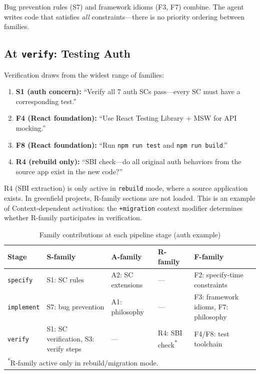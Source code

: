 \documentclass[11pt,a4paper,openright,twoside]{report}
\begin{document}
Bug prevention rules (S7) and framework idioms (F3, F7) combine. The agent writes code that satisfies \emph{all} constraints---there is no priority ordering between families.

\subsection{At \texttt{verify}: Testing Auth}

Verification draws from the widest range of families:

\begin{enumerate}[nosep]
  \item \textbf{S1 (auth concern):} ``Verify all 7 auth SCs pass---every SC must have a corresponding test.''
  \item \textbf{F4 (React foundation):} ``Use React Testing Library + MSW for API mocking.''
  \item \textbf{F8 (React foundation):} ``Run \texttt{npm run test} and \texttt{npm run build}.''
  \item \textbf{R4 (rebuild only):} ``SBI check---do all original auth behaviors from the source app exist in the new code?''
\end{enumerate}

\begin{tipbox}
R4 (SBI extraction) is only active in \texttt{rebuild} mode, where a source application exists. In greenfield projects, R-family sections are not loaded. This is an example of Context-dependent activation: the \texttt{+migration} context modifier determines whether R-family participates in verification.
\end{tipbox}

\begin{table}[H]
\centering
\caption{Family contributions at each pipeline stage (auth example)}
\label{tab:family-pipeline-merge}
\begin{tabularx}{\textwidth}{lXXXX}
\toprule
\textbf{Stage} & \textbf{S-family} & \textbf{A-family} & \textbf{R-family} & \textbf{F-family} \\
\midrule
\texttt{specify}   & S1: SC rules  & A2: SC extensions  & ---  & F2: specify-time constraints \\
\texttt{implement} & S7: bug prevention  & A1: philosophy  & ---  & F3: framework idioms, F7: philosophy \\
\texttt{verify}    & S1: SC verification, S3: verify steps  & ---  & R4: SBI check\textsuperscript{*}  & F4/F8: test toolchain \\
\bottomrule
\multicolumn{5}{l}{\footnotesize \textsuperscript{*}R-family active only in rebuild/migration mode.}
\end{tabularx}
\end{table}
\end{document}
